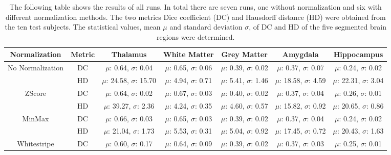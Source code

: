 \documentclass[journal]{IEEEtran}
\begin{document}
\begin{table}[h]
	\caption{The following table shows the results of all runs. In total there are seven runs, one without normalization and six with different normalization methods. The two metrics Dice coefficient (DC) and Hausdorff distance (HD) were obtained from the ten test subjects. The statistical values, mean $\mu$ and standard deviation $\sigma$, of DC and HD of the five segmented brain regions were determined.}
	\label{tab:diceHD}
	\begin{center}
	\begin{threeparttable}
	\begin{tabular}{c c c c c c c}
		\toprule
			\textbf{Normalization} & \textbf{Metric} &  \textbf{Thalamus} & \textbf{White Matter} & \textbf{Grey Matter} & \textbf{Amygdala} & \textbf{Hippocampus} \\ \midrule
		No Normalization		&	DC	&	$\mu$: 0.64, $\sigma$: 0.04		&	$\mu$: 0.65, $\sigma$: 0.06		&	$\mu$: 0.39, $\sigma$: 0.02		&	$\mu$: 0.37, $\sigma$: 0.07		&	$\mu$: 0.24, $\sigma$: 0.02		\\ \cmidrule(lr{1em}){2-7}
								&	HD	&	$\mu$: 24.58, $\sigma$: 15.70	&	$\mu$: 4.94, $\sigma$: 0.71		&	$\mu$: 5.41, $\sigma$: 1.46		&	$\mu$: 18.58, $\sigma$: 4.59	&	$\mu$: 22.31, $\sigma$: 3.04	\\ \midrule
		ZScore					&	DC	&	$\mu$: 0.64, $\sigma$: 0.02		&	$\mu$: 0.67, $\sigma$: 0.03		&	$\mu$: 0.40, $\sigma$: 0.02		&	$\mu$: 0.37, $\sigma$: 0.04		&	$\mu$: 0.26, $\sigma$: 0.01 	\\ \cmidrule(lr{1em}){2-7}
								&	HD	&	$\mu$: 39.27, $\sigma$: 2.36	&	$\mu$: 4.24, $\sigma$: 0.35		&	$\mu$: 4.60, $\sigma$: 0.57		&	$\mu$: 15.82, $\sigma$: 0.92	&	$\mu$: 20.65, $\sigma$: 0.86 	\\ \midrule
		MinMax 					&	DC	&	$\mu$: 0.66, $\sigma$: 0.03		&	$\mu$: 0.65, $\sigma$: 0.03		&	$\mu$: 0.39, $\sigma$: 0.02		&	$\mu$: 0.37, $\sigma$: 0.04		&	$\mu$: 0.24, $\sigma$: 0.02 	\\ \cmidrule(lr{1em}){2-7}
								&	HD	&	$\mu$: 21.04, $\sigma$: 1.73	&	$\mu$: 5.53, $\sigma$: 0.31		&	$\mu$: 5.04, $\sigma$: 0.92		&	$\mu$: 17.45, $\sigma$: 0.72	&	$\mu$: 20.43, $\sigma$: 1.63 	\\ \midrule
		Whitestripe 			&	DC	&	$\mu$: 0.60, $\sigma$: 0.17		&	$\mu$: 0.64, $\sigma$: 0.09		&	$\mu$: 0.39, $\sigma$: 0.02		&	$\mu$: 0.37, $\sigma$: 0.03		&	$\mu$: 0.25, $\sigma$: 0.01 	\\ \cmidrule(lr{1em}){2-7}

\end{tabular}
\end{threeparttable}
\end{center}
\end{table}
\end{document}
